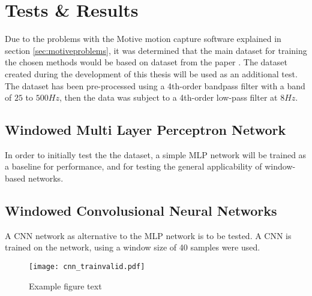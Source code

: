 \documentclass[../main.tex]{subfiles}
\begin{document}
\section{Tests \& Results}

Due to the problems with the Motive motion capture software explained in section \ref{sec:motiveproblems}, it was determined that the main dataset for training the chosen methods would be based on dataset \cite{kinmusdataset} from the paper \cite{jarque2019}.
The dataset created during the development of this thesis will be used as an additional test. 
The dataset has been pre-processed using a 4th-order bandpass filter with a band of  $25$ to $500Hz$, then the data was subject to a 4th-order low-pass filter at $8 Hz$.


\subsection{Windowed Multi Layer Perceptron Network}

In order to initially test the the dataset, a simple MLP network will be trained as a baseline for performance, and for testing the general applicability of window-based networks.





\subsection{Windowed Convolusional Neural Networks}

A CNN network as alternative to the MLP network is to be tested.
A CNN is trained on the network, using a window size of 40 samples were used.

\begin{figure}[h]
\begin{center}
\texttt{[image: cnn\_trainvalid.pdf]}
\caption{Example figure text}
\label{fig:cnntrainvalid}
\end{center}
\end{figure}
\end{document}
